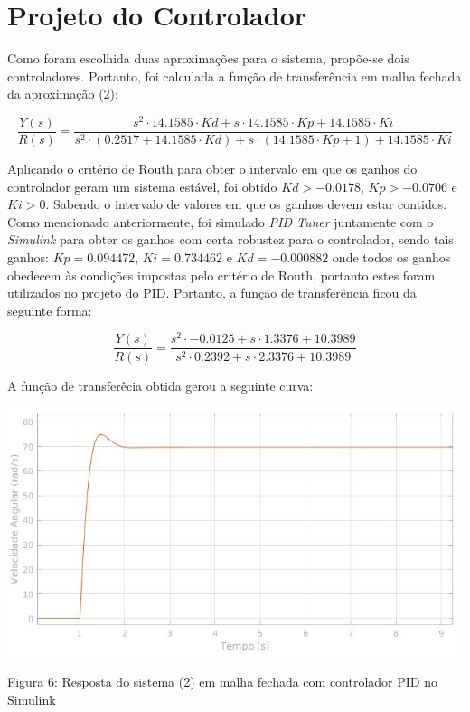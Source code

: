 \documentclass{article}
\begin{document}
\section{Projeto do Controlador}
Como foram escolhida duas aproximações para o sistema, propõe-se dois controladores. Portanto, foi calculada a função de transferência em malha fechada da aproximação (2):

\begin{equation}
    \frac{Y(s)}{R(s)} = \frac{s^{2\!} \cdot {14.1585 \cdot Kd} + s \cdot {14.1585 \cdot Kp} + {14.1585 \cdot Ki}}{s^{2\!} \cdot {(0.2517+14.1585 \cdot Kd)} + s \cdot {(14.1585 \cdot Kp + 1)} + {14.1585 \cdot Ki}}
    \end{equation}
    
    Aplicando o critério de Routh para obter o intervalo em que os ganhos do controlador geram um sistema estável, foi obtido $Kd > -0.0178$, $Kp > -0.0706$ e $Ki > 0$. Sabendo o intervalo de valores em que os ganhos devem estar contidos. Como mencionado anteriormente, foi simulado \textit{PID Tuner} juntamente com o \textit{Simulink} para obter os ganhos com certa robustez para o controlador, sendo tais ganhos: $Kp = 0.094472$, $Ki = 0.734462$ e $Kd = -0.000882$ onde todos os ganhos obedecem às condições impostas pelo critério de Routh, portanto estes foram utilizados no projeto do PID. Portanto, a função de transferência ficou da seguinte forma:
    
    \begin{equation}
    \frac{Y(s)}{R(s)} = \frac{s^{2\!} \cdot {-0.0125} + s \cdot {1.3376} + {10.3989}}{s^{2\!} \cdot {0.2392} + s \cdot {2.3376} + {10.3989}}
    \end{equation}
    
    A função de transferêcia obtida gerou a seguinte curva:
    
    \begin{center}
    \centering
        \includegraphics[scale=0.5]{imagens/PID2Param.jpg}
        
        \caption{Figura 6: Resposta do sistema (2) em malha fechada com controlador PID no Simulink}
    \end{center}
    
\end{document}
